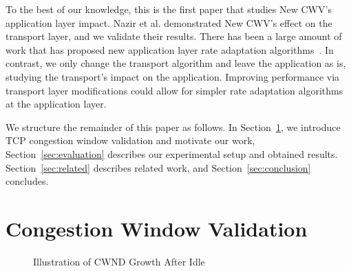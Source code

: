 \documentclass[10pt,sigconf,anonymous]{acmart}
\begin{document}
To the best of our knowledge, this is the first paper that studies New CWV's application layer impact. Nazir et al. \cite{Nazir-2014-performance-evaluation-congestion-window-validation-dash-newcwv} demonstrated New CWV's effect on the transport layer, and we validate their results. There has been a large amount of work that has proposed new application layer rate adaptation algorithms~\cite{Mok-2012-qdash,Huang-2015-A-buffer-based-approach-to-rate-adaptation-bba, Yin-2015-a-control-theoritic-approach}. In contrast, we only change the transport algorithm and leave the application as is, studying the transport's impact on the application. Improving performance via transport layer modifications could allow for simpler rate adaptation algorithms at the application layer. %


We structure the remainder of this paper as follows. In Section~\ref{sec:background}, we introduce TCP congestion window validation and motivate our work, Section~\ref{sec:evaluation} describes our experimental setup and obtained results. Section~\ref{sec:related} describes related work, and Section~\ref{sec:conclusion} concludes.

\section{Congestion Window Validation}
\label{sec:background}

\begin{figure}
  \centering
    \caption{Illustration of CWND Growth After Idle}
    \label{fig:cwnd-growth-after-idle}
\end{figure}
\end{document}
